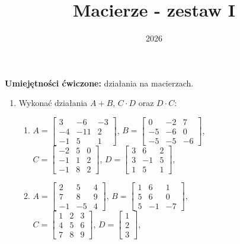 \documentclass{article}
\title{Macierze - zestaw I}
\date{2026}
\begin{document}
\maketitle

\begin{center}
\textbf{Umiejętności ćwiczone:} działania na macierzach.
\end{center}

\begin{enumerate}
    \item Wykonać działania $A+B$, $C \cdot D$ oraz $D \cdot C$:
    \begin{enumerate}
        \item $A = \begin{bmatrix} 3 & -6 & -3\\  -4 & -11 & 2\\ -1 & 5 & 1 \end{bmatrix}$, $B = \begin{bmatrix} 0 & -2 & 7\\  -5 & -6 & 0\\ -5 & -5 & -6 \end{bmatrix}$, \\ $C = \begin{bmatrix} -2 & 5 & 0\\  -1 & 1 & 2\\ -1 & 8 & 2 \end{bmatrix}$, $D = \begin{bmatrix} 3 & 6 & 2\\  3 & -1 & 5\\ 1 & 5 & 1 \end{bmatrix}$,
        \item $A = \begin{bmatrix} 2 & 5 & 4\\  7 & 8 & 9\\ -1 & -5 & 4 \end{bmatrix}$, $B = \begin{bmatrix} 1 & 6 & 1\\  5 & 6 & 0\\ 5 & -1 & -7 \end{bmatrix}$, \\ $C = \begin{bmatrix} 1 & 2 & 3\\  4 & 5 & 6\\ 7 & 8 & 9 \end{bmatrix}$, $D = \begin{bmatrix} 1\\ 2\\ 3 \end{bmatrix}$,

\end{enumerate}
\end{enumerate}
\end{document}
